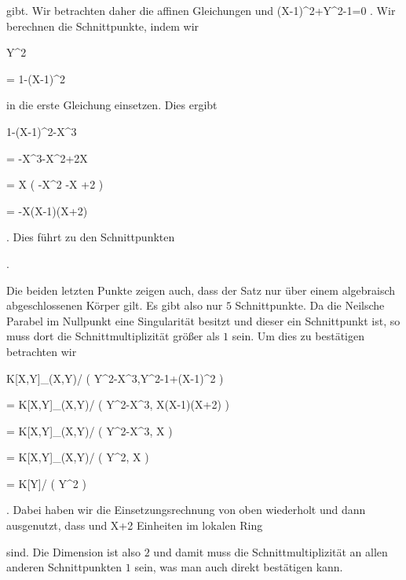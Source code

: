 { gibt. Wir betrachten daher die affinen Gleichungen   {  und  }  {  (X-1)^2+Y^2-1=0   }{ .} Wir berechnen die Schnittpunkte, indem wir


\mavergleichskette

{\vergleichskette

{Y^2
}

{ = }{ 1-(X-1)^2
}

{  }{
}

{    }{
}

{   }{
}

}
{}{}{}
in die erste Gleichung einsetzen. Dies ergibt


\mavergleichskettedisp

{\vergleichskette

{ 1-(X-1)^2-X^3
}

{ =} { -X^3-X^2+2X
}

{ =} { X \left(  -X^2 -X +2  \right)
}

{ =} { -X(X-1)(X+2)
}

{ } {}

}
{}{}{.}
Dies führt zu den Schnittpunkten


 { . }


Die beiden letzten Punkte zeigen auch, dass der Satz nur über einem algebraisch abgeschlossenen Körper gilt. Es gibt also nur $5$ Schnittpunkte. Da die Neilsche Parabel im Nullpunkt eine Singularität besitzt und dieser ein Schnittpunkt ist, so muss dort die Schnittmultiplizität größer als $1$ sein. Um dies zu bestätigen betrachten wir


\mavergleichskettealigndrucklinks

{\vergleichskettealigndrucklinks

{ K[X,Y]_{(X,Y)}/ \left(  Y^2-X^3,Y^2-1+(X-1)^2  \right)
}

{ =} { K[X,Y]_{(X,Y)}/ \left(  Y^2-X^3, X(X-1)(X+2)  \right)
}

{ =} { K[X,Y]_{(X,Y)}/ \left(  Y^2-X^3, X  \right)
}

{ =} { K[X,Y]_{(X,Y)}/ \left(  Y^2, X  \right)
}

{ =} { K[Y]/ \left(  Y^2  \right)
}

}
{}{}{.}
Dabei haben wir die Einsetzungsrechnung von oben wiederholt und dann ausgenutzt, dass   {  und  }  { X+2   }{ } Einheiten im lokalen Ring

 sind. Die Dimension ist also $2$ und damit muss die Schnittmultiplizität an allen anderen Schnittpunkten $1$ sein, was man auch direkt bestätigen kann.


}
